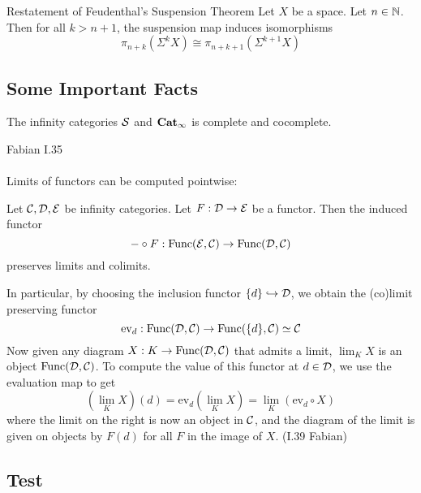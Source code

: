 \documentclass[a4paper]{article}
\begin{document}
\begin{thm}{Restatement of Feudenthal's Suspension Theorem}{} Let $X$ be a space. Let $n\in\mathbb{N}$. Then for all $k>n+1$, the suspension map induces isomorphisms $$\pi_{n+k}(\Sigma^kX)\cong\pi_{n+k+1}(\Sigma^{k+1}X)$$
\end{thm}

\subsection{Some Important Facts}
\begin{prp}{}{} The infinity categories $\mathcal{S}$ and $\bold{Cat}_\infty$ is complete and cocomplete. 
\end{prp}

Fabian I.35\\~\\

Limits of functors can be computed pointwise: 

\begin{prp}{}{} Let $\mathcal{C},\mathcal{D},\mathcal{E}$ be infinity categories. Let $F:\mathcal{D}\to\mathcal{E}$ be a functor. Then the induced functor $$-\circ F:\text{Func}(\mathcal{E},\mathcal{C})\to\text{Func}(\mathcal{D},\mathcal{C})$$ preserves limits and colimits. 
\end{prp}

In particular, by choosing the inclusion functor $\{d\}\hookrightarrow\mathcal{D}$, we obtain the (co)limit preserving functor $$\text{ev}_d:\text{Func}(\mathcal{D},\mathcal{C})\to\text{Func}(\{d\},\mathcal{C})\simeq\mathcal{C}$$ Now given any diagram $X:K\to\text{Func}(\mathcal{D},\mathcal{C})$ that admits a limit, $\lim_K X$ is an object $\text{Func}(\mathcal{D},\mathcal{C})$. To compute the value of this functor at $d\in\mathcal{D}$, we use the evaluation map to get $$\left(\lim_K X\right)(d)=\text{ev}_d\left(\lim_KX\right)=\lim_K(\text{ev}_d\circ X)$$ where the limit on the right is now an object in $\mathcal{C}$, and the diagram of the limit is given on objects by $F(d)$ for all $F$ in the image of $X$. (I.39 Fabian)

\subsection{Test}
\\~\\
\end{document}
